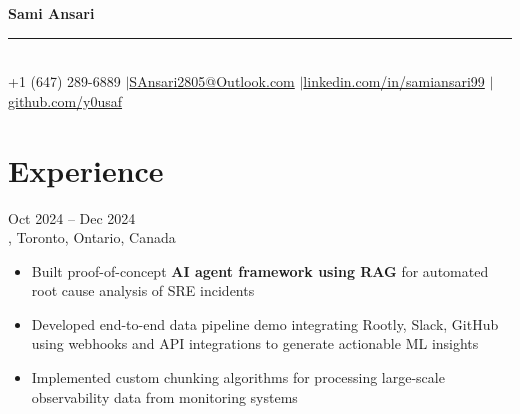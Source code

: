 \documentclass[letterpaper,10pt]{article}
\begin{document}
\begin{center}
{\LARGE\bfseries Sami Ansari} \\
\vspace{1pt}
{\rule{0.3\textwidth}{0.5pt}} \\
\vspace{4pt}
\small +1 (647) 289-6889 \enspace$|$\enspace \href{mailto:SAnsari2805@Outlook.com}{SAnsari2805@Outlook.com} \enspace$|$\enspace \href{https://linkedin.com/in/samiansari99/}{linkedin.com/in/samiansari99} \enspace$|$\enspace \href{https://github.com/y0usaf}{github.com/y0usaf}
\end{center}
\vspace{-4pt}

\section{Experience}

\hspace{0.15in}{\large\bfseries AI Engineer (Contract)} \hfill {\small Oct 2024 -- Dec 2024} \\
\hspace{0.15in}{\bfseries Rootly}, Toronto, Ontario, Canada
\vspace{-1pt}
\begin{itemize}[leftmargin=0.35in, itemsep=-1pt, topsep=1pt, labelsep=0.035in]
\item Built proof-of-concept \textbf{AI agent framework using RAG} for automated root cause analysis of SRE incidents
\item Developed end-to-end data pipeline demo integrating Rootly, Slack, GitHub using webhooks and API integrations to generate actionable ML insights
\item Implemented custom chunking algorithms for processing large-scale observability data from monitoring systems
\end{itemize}
\vspace{1pt}
\end{document}
